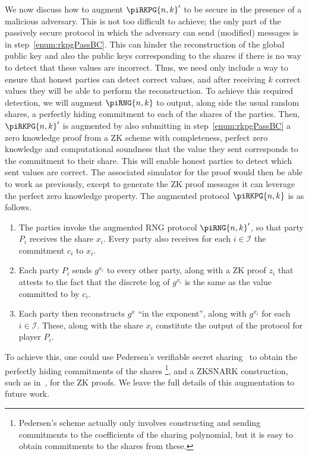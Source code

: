 \documentclass{article}
\theoremstyle{remark}
\begin{document}
We now discuss how to augment ${\piRKPG{n,k}}'$ to be secure in the presence of
a malicious adversary. This is not too difficult to achieve; the only part of
the passively secure protocol in which the adversary can send (modified)
messages is in step~\ref{enum:rkpgPassBC}. This can hinder the reconstruction
of the global public key and also the public keys corresponding to the shares
if there is no way to detect that these values are incorrect. Thus, we need
only include a way to ensure that honest parties can detect correct values, and
after receiving $k$ correct values they will be able to perform the
reconstruction.  To achieve this required detection, we will augment
$\piRNG{n,k}$ to output, along side the usual random shares, a perfectly hiding
commitment to each of the shares of the parties. Then, ${\piRKPG{n,k}}'$ is
augmented by also submitting in step~\ref{enum:rkpgPassBC} a zero knowledge
proof from a ZK scheme with completeness, perfect zero knowledge and
computational soundness that the value they sent corresponds to the commitment
to their share. This will enable honest parties to detect which sent values are
correct. The associated simulator for the proof would then be able to work as
previously, except to generate the ZK proof messages it can leverage the
perfect zero knowledge property. The augmented protocol $\piRKPG{n,k}$ is as
follows.

\begin{enumerate}
	\item The parties invoke the augmented RNG protocol ${\piRNG{n,k}}'$, so
		that party $P_i$ receives the share $x_i$. Every party also receives
		for each $i \in \mathcal{I}$ the commitment $c_i$ to $x_i$.

	\item Each party $P_i$ sends $g^{x_i}$ to every other party, along with a
		ZK proof $z_i$ that attests to the fact that the discrete log of
		$g^{x_i}$ is the same as the value committed to by $c_i$.

	\item Each party then reconstructs $g^x$ ``in the exponent'', along with
		$g^{x_i}$ for each $i \in \mathcal{I}$. These, along with the share
		$x_i$ constitute the output of the protocol for player $P_i$.
\end{enumerate}

To achieve this, one could use Pedersen's verifiable secret sharing~\cite{p91a}
to obtain the perfectly hiding commitments of the shares%
\footnote{%
	Pedersen's scheme actually only involves constructing and sending
	commitments to the coefficients of the sharing polynomial, but it is easy
	to obtain commitments to the shares from these.
},
and a ZKSNARK construction, such as in~\cite{g16}, for the ZK proofs. We leave
the full details of this augmentation to future work.
\end{document}
